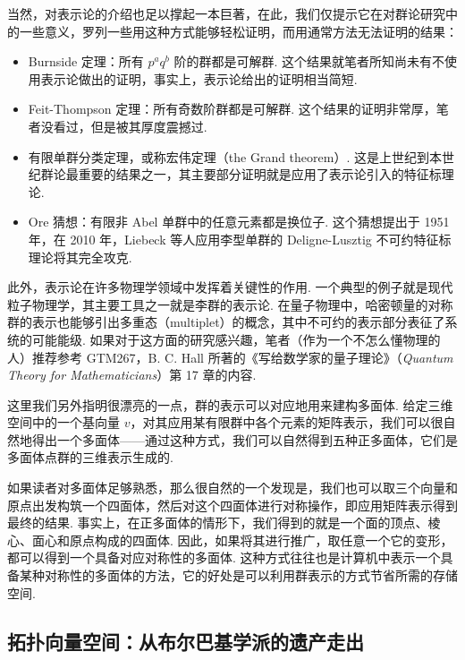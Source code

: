 当然，对表示论的介绍也足以撑起一本巨著，在此，我们仅提示它在对群论研究中的一些意义，罗列一些用这种方式能够轻松证明，而用通常方法无法证明的结果：
\begin{itemize}
    \item Burnside 定理：所有 $p^aq^b$ 阶的群都是可解群. 这个结果就笔者所知尚未有不使用表示论做出的证明，事实上，表示论给出的证明相当简短.

    \item Feit-Thompson 定理：所有奇数阶群都是可解群. 这个结果的证明非常厚，笔者没看过，但是被其厚度震撼过.

    \item 有限单群分类定理，或称宏伟定理（the Grand theorem）. 这是上世纪到本世纪群论最重要的结果之一，其主要部分证明就是应用了表示论引入的特征标理论.

    \item Ore 猜想：有限非 Abel 单群中的任意元素都是换位子. 这个猜想提出于 1951 年，在 2010 年，Liebeck 等人应用李型单群的 Deligne-Lusztig 不可约特征标理论将其完全攻克.
\end{itemize}

此外，表示论在许多物理学领域中发挥着关键性的作用. 一个典型的例子就是现代粒子物理学，其主要工具之一就是李群的表示论. 在量子物理中，哈密顿量的对称群的表示也能够引出多重态（multiplet）的概念，其中不可约的表示部分表征了系统的可能能级. 如果对于这方面的研究感兴趣，笔者（作为一个不怎么懂物理的人）推荐参考 GTM267，B. C. Hall 所著的《写给数学家的量子理论》（\textit{Quantum Theory for Mathematicians}）第 17 章的内容.

这里我们另外指明很漂亮的一点，群的表示可以对应地用来建构多面体. 给定三维空间中的一个基向量 $v$，对其应用某有限群中各个元素的矩阵表示，我们可以很自然地得出一个多面体——通过这种方式，我们可以自然得到五种正多面体，它们是多面体点群的三维表示生成的.

如果读者对多面体足够熟悉，那么很自然的一个发现是，我们也可以取三个向量和原点出发构筑一个四面体，然后对这个四面体进行对称操作，即应用矩阵表示得到最终的结果. 事实上，在正多面体的情形下，我们得到的就是一个面的顶点、棱心、面心和原点构成的四面体. 因此，如果将其进行推广，取任意一个它的变形，都可以得到一个具备对应对称性的多面体. 这种方式往往也是计算机中表示一个具备某种对称性的多面体的方法，它的好处是可以利用群表示的方式节省所需的存储空间.

\subsection{拓扑向量空间：从布尔巴基学派的遗产走出}

